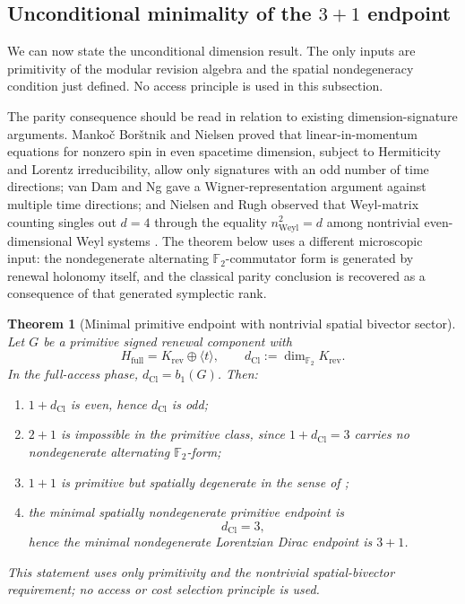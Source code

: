\documentclass[11pt]{article}
\newtheorem{theorem}{Theorem}[section]
\theoremstyle{definition}
\theoremstyle{remark}
\newcommand{\F}{\mathbb{F}}
\newcommand{\Hf}{H_{\mathrm{full}}}
\newcommand{\dCl}{d_{\mathrm{Cl}}}
\begin{document}
\subsection{Unconditional minimality of the \texorpdfstring{$3+1$}{3+1} endpoint}
\label{subsec:minimal-3plus1}

We can now state the unconditional dimension result.  The only inputs are
primitivity of the modular revision algebra and the spatial nondegeneracy
condition just defined.  No access principle is used in this subsection.

The parity consequence should be read in relation to existing
dimension-signature arguments.  Manko\v{c} Bor\v{s}tnik and Nielsen proved that
linear-in-momentum equations for nonzero spin in even spacetime dimension,
subject to Hermiticity and Lorentz irreducibility, allow only signatures with an
odd number of time directions; van Dam and Ng gave a Wigner-representation
argument against multiple time directions; and Nielsen and Rugh observed that
Weyl-matrix counting singles out \(d=4\) through the equality
\(n_{\mathrm{Weyl}}^2=d\) among nontrivial even-dimensional Weyl systems
\cite{mankocborstniknielsen2000,vandamng2001,nielsenrugh1994}.  The theorem
below uses a different microscopic input: the nondegenerate alternating
\(\F_2\)-commutator form is generated by renewal holonomy itself, and the
classical parity conclusion is recovered as a consequence of that generated
symplectic rank.

\begin{theorem}[Minimal primitive endpoint with nontrivial spatial bivector sector]
\label{thm:minimal-nondegenerate-3plus1}
Let \(G\) be a primitive signed renewal component with
\[
  \Hf=K_{\mathrm{rev}}\oplus\langle t\rangle,
  \qquad
  \dCl:=\dim_{\F_2}K_{\mathrm{rev}}.
\]
In the full-access phase, \(\dCl=b_1(G)\).  Then:
\begin{enumerate}[label=\textup{(\roman*)},leftmargin=2.4em]
\item \(1+\dCl\) is even, hence \(\dCl\) is odd;
\item \(2+1\) is impossible in the primitive class, since \(1+\dCl=3\) carries no
      nondegenerate alternating \(\F_2\)-form;
\item \(1+1\) is primitive but spatially degenerate in the sense of
      ;
\item the minimal spatially nondegenerate primitive endpoint is
      \[
        \boxed{\dCl=3},
      \]
      hence the minimal nondegenerate Lorentzian Dirac endpoint is \(3+1\).
\end{enumerate}
This statement uses only primitivity and the nontrivial spatial-bivector
requirement; no access or cost selection principle is used.
\end{theorem}
\end{document}

